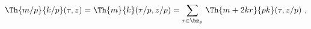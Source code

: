 \begin{equation}
\Th{m/p}{k/p}(\tau,z)=\Th{m}{k}(\tau/p,z/p)=
\sum_{r\in\bz_p} \,\Th{m+2kr}{pk}(\tau,z/p)~,
\label{theta identity}
\end{equation}

